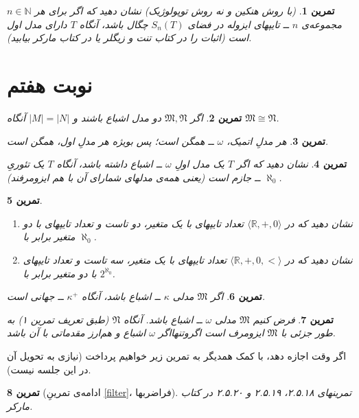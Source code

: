 \documentclass[12pt,a4paper]{report}
\theoremstyle{colorhead}
\newtheorem{tam}{تمرین}
\begin{document}
\begin{tam}
\label{avalhazfetype}
(با روش هنکین و نه روش توپولوژیک) نشان دهید که اگر
برای هر
$n\in \mathbb{N}$
مجموعه‌ی
$n$
ــ
تایپهای ایزوله در فضای
$S_n(T)$
چگال باشد، آنگاه $T$
دارای مدل اول است (اثبات را در کتاب تنت و زیگلر یا در کتاب مارکر بیابید).
\end{tam}
\section{نوبت هفتم}
\begin{tam}
اگر
$\mathfrak{M},\mathfrak{N}$
دو مدل اشباع 
باشند و 
$|M|=|N|$
آنگاه 
$\mathfrak{M}\cong \mathfrak{N}$.
\end{tam}
\begin{tam}
هر مدلِ
اتمیک،
$\omega$
ــ
همگن است؛ پس بویژه هر مدلِ اول، همگن است.
\end{tam}
\begin{tam}
نشان دهید که اگر
$T$
یک مدل اولِ
$\omega$
ــ
اشباع داشته باشد، آنگاه $T$
یک تئوریِ
$\aleph_0$
ــ
جازم است (یعنی همه‌ی مدلهای شمارای آن با هم ایزومرفند).
\end{tam}
\begin{tam}
\hfill
\begin{enumerate}
\item 
نشان دهید که در
$\langle \mathbb{R},+,0\rangle$
تعداد تایپهای با یک متغیر، دو تاست و تعداد تایپهای با دو متغیر برابر با
$\aleph_0$.
\item 
نشان دهید که در
$\langle \mathbb{R},+,0,<\rangle$
تعداد تایپهای با یک متغیر، سه تاست و تعداد تایپهای با دو متغیر برابر با
$2^{\aleph_0}$.

\end{enumerate}

\end{tam}

\begin{tam}
اگر
$\mathfrak{M}$
مدلی
$\kappa$ ــ
اشباع باشد، آنگاه 
$\kappa^+$
ــ 
جهانی است.
\end{tam}
\begin{tam}
فرض کنیم
$\mathfrak{M}$
مدلی
$\omega$ ــ
اشباع باشد. آنگاه
$\mathfrak{N}$
(طبق تعریف تمرین ۱) به طور جزئی با
$\mathfrak{M}$
ایزومرف است اگروتنهااگر
$\omega$
اشباع و هم‌ارز مقدماتی با آن باشد.
\end{tam}
اگر وقت اجازه دهد، با کمک همدیگر به تمرین زیر خواهیم پرداخت (نیازی به تحویل آن در این جلسه نیست).
\begin{tam}[ادامه‌ی تمرینِ
\ref{filter}، فراضربها
]
تمرینهای
۲.۵.۱۸،
 ۲.۵.۱۹ و ۲.۵.۲۰ در کتاب مارکر. 
\end{tam}
\end{document}
